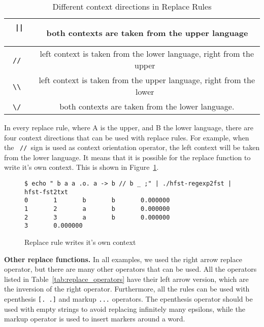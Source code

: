 \documentclass{llncs}
\begin{document}
\begin{table} [h!]
\centering
\begin{tabular}{ | c | c | }
\hline
\ \verb!||!\ & \ both contexts are taken from the upper language \\ \hline
\ \verb!//!\ & \ left context is taken from the lower language, right from the upper \\ \hline
\ \verb!\\!\ & \ left context is taken from the upper language, right from the lower \\ \hline
\ \verb!\/!\ & \ both contexts are taken from the lower language. \\ \hline
\end{tabular}
\caption{Different context directions in Replace Rules}
\label{tab:context_directions}
\end{table}

In every replace rule, where A is the upper, and B the lower language, there are four context directions that can be used with replace rules. For example, when the \ \verb!//!\ sign is used as context orientation operator, the left context will be taken from the lower language. It means that it is possible for the replace function to write it's own context. This is shown in Figure~\ref{fig:context_orientation}. 

\begin{figure} [h!]
 \begin{verbatim}
$ echo " b a a .o. a -> b // b _ ;" | ./hfst-regexp2fst | hfst-fst2txt
0       1       b       b       0.000000
1       2       a       b       0.000000
2       3       a       b       0.000000
3       0.000000
\end{verbatim}
\caption{Replace rule writes it's own context}
\label{fig:context_orientation}
\end{figure}





\textbf{Other replace functions.} In all examples, we used the right arrow replace operator, but there are many other operators that can be used. All the operators listed in Table~\ref{tab:replace_operators} have their left arrow version, which are the inversion of the right operator. Furthermore, all the rules can be used with epenthesis \verb![. .]! and markup \verb!...! operators. The epenthesis operator should be used with empty strings to avoid replacing infinitely many epsilons, while the markup operator is used to insert markers around a word.
\end{document}
